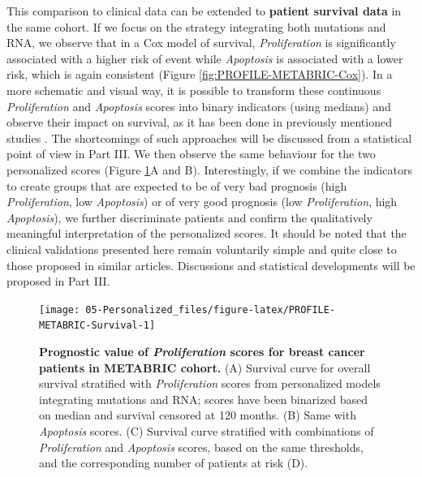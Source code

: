 \documentclass[a4paper,12pt,twoside,onecolumn,openright,final,oldfontcommands]{memoir}
\begin{document}
This comparison to clinical data can be extended to \textbf{patient
survival data} in the same cohort. If we focus on the strategy
integrating both mutations and RNA, we observe that in a Cox model of
survival, \emph{Proliferation} is significantly associated with a higher
risk of event while \emph{Apoptosis} is associated with a lower risk,
which is again consistent (Figure \ref{fig:PROFILE-METABRIC-Cox}). In a
more schematic and visual way, it is possible to transform these
continuous \emph{Proliferation} and \emph{Apoptosis} scores into binary
indicators (using medians) and observe their impact on survival, as it
has been done in previously mentioned studies
\citep{fey2015signaling, salvucci2019system}. The shortcomings of such
approaches will be discussed from a statistical point of view in Part
III. We then observe the same behaviour for the two personalized scores
(Figure \ref{fig:PROFILE-METABRIC-Survival}A and B). Interestingly, if
we combine the indicators to create groups that are expected to be of
very bad prognosis (high \emph{Proliferation}, low \emph{Apoptosis}) or
of very good prognosis (low \emph{Proliferation}, high
\emph{Apoptosis}), we further discriminate patients and confirm the
qualitatively meaningful interpretation of the personalized scores. It
should be noted that the clinical validations presented here remain
voluntarily simple and quite close to those proposed in similar
articles. Discussions and statistical developments will be proposed in
Part III.

\begin{figure}

{\centering \texttt{[image: 05-Personalized\_files/figure-latex/PROFILE-METABRIC-Survival-1]} 

}

\caption[Prognostic value of \emph{Proliferation} scores for breast cancer patients in METABRIC cohort]{\textbf{Prognostic value of
\emph{Proliferation} scores for breast cancer patients in METABRIC
cohort.} (A) Survival curve for overall survival stratified with
\emph{Proliferation} scores from personalized models integrating
mutations and RNA; scores have been binarized based on median and
survival censored at 120 months. (B) Same with \emph{Apoptosis} scores.
(C) Survival curve stratified with combinations of \emph{Proliferation}
and \emph{Apoptosis} scores, based on the same thresholds, and the
corresponding number of patients at risk (D).}\label{fig:PROFILE-METABRIC-Survival}
\end{figure}
\end{document}
